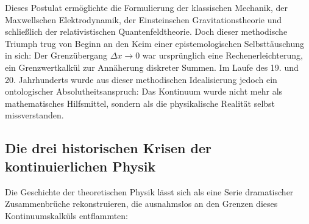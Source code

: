 \documentclass[11pt,a4paper]{article}
\theoremstyle{definition}
\theoremstyle{remark}
\numberwithin{equation}{section}
\begin{document}
Dieses Postulat ermöglichte die Formulierung der klassischen Mechanik, der Maxwellschen Elektrodynamik, der Einsteinschen Gravitationstheorie und schließlich der relativistischen Quantenfeldtheorie. Doch dieser methodische Triumph trug von Beginn an den Keim einer epistemologischen Selbsttäuschung in sich: Der Grenzübergang $\Delta x \to 0$ war ursprünglich eine Rechenerleichterung, ein Grenzwertkalkül zur Annäherung diskreter Summen. Im Laufe des 19. und 20. Jahrhunderts wurde aus dieser methodischen Idealisierung jedoch ein ontologischer Absolutheitsanspruch: Das Kontinuum wurde nicht mehr als mathematisches Hilfsmittel, sondern als die physikalische Realität selbst missverstanden.

\subsection{Die drei historischen Krisen der kontinuierlichen Physik}

Die Geschichte der theoretischen Physik lässt sich als eine Serie dramatischer Zusammenbrüche rekonstruieren, die ausnahmslos an den Grenzen dieses Kontinuumskalküls entflammten:
\end{document}
